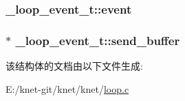 \subsubsection[{event}]{ \+\_\+loop\+\_\+event\+\_\+t\+::event}\label{a00030_a76dd6f9dca6bec4527fbe55184812a70_a76dd6f9dca6bec4527fbe55184812a70}
\hypertarget{a00030_a0660974e7b88bb3715f6a61eae8c9721_a0660974e7b88bb3715f6a61eae8c9721}{}
\subsubsection[{send\+\_\+buffer}]{$\ast$ \+\_\+loop\+\_\+event\+\_\+t\+::send\+\_\+buffer}\label{a00030_a0660974e7b88bb3715f6a61eae8c9721_a0660974e7b88bb3715f6a61eae8c9721}


该结构体的文档由以下文件生成\+:\begin{DoxyCompactItemize}
\item 
E\+:/knet-\/git/knet/knet/\hyperlink{a00076}{loop.\+c}\end{DoxyCompactItemize}
